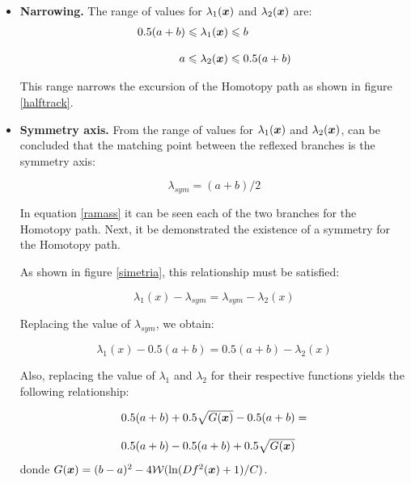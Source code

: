 \documentclass[conference,letterpaper,onecolumn]{IEEEtran}
\newcommand{\pig}[1]{\mbox{\boldmath ${#1}$}	}
\begin{document}
\begin{itemize}
\item {\bf Narrowing.} The range of values for $\lambda_1(\pig{x})$ and $\lambda_2(\pig{x})$ are:
\begin{displaymath}
\begin{array}{l}
0.5(a+b) \leqslant \lambda_1(\pig{x}) \leqslant b\\\\
\hspace{13mm}a \leqslant \lambda_2(\pig{x}) \leqslant 0.5(a+b)
\end{array}
\end{displaymath}

This range narrows the excursion of the Homotopy path as shown in figure \ref{halftrack}.

\item {\bf Symmetry axis.} From the range of values for $\lambda_1(\pig{x})$ and $\lambda_2(\pig{x})$, can be concluded that the matching point between the reflexed branches is the symmetry axis:

\begin{displaymath}
\lambda_{sym}=(a+b)/2
\end{displaymath}

In equation \ref{ramass} it can be seen each of the two branches for the Homotopy path. Next, it be demonstrated the existence of a symmetry for the Homotopy path.

As shown in figure \ref{simetria}, this relationship must be satisfied:

\begin{displaymath}
\lambda_1(x)-\lambda_{sym}=\lambda_{sym} -\lambda_2(x)
\end{displaymath}

Replacing the value of $\lambda_{sym}$, we obtain:

\begin{displaymath}
\lambda_1(x)-0.5(a+b)=0.5(a+b)-\lambda_2(x)
\end{displaymath}

Also, replacing the value of $\lambda_1$ and $\lambda_2$ for their respective functions yields the following relationship:

\begin{displaymath}
\begin{array}{l}
0.5(a+b)+0.5\sqrt{G(\pig{x})}-0.5(a+b)= \\ \\
0.5(a+b)-0.5(a+b)+0.5\sqrt{G(\pig{x})}
\end{array}
\end{displaymath}
donde
{\small $G(\pig{x})=(b-a)^2-4{\cal{W}}(\ln(Df^2(\pig{x})+1)/C)$}.


\end{itemize}
\end{document}

